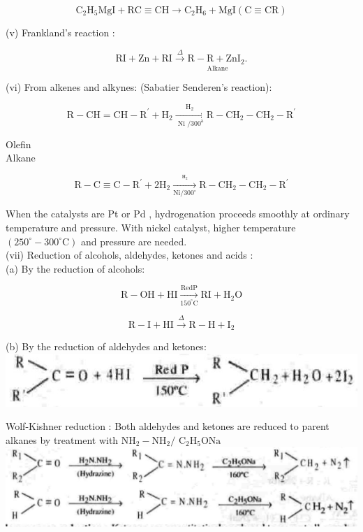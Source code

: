 \documentclass[10pt]{article}
\begin{document}
$$
\mathrm{C}_{2} \mathrm{H}_{5} \mathrm{MgI}+\mathrm{RC} \equiv \mathrm{CH} \longrightarrow \mathrm{C}_{2} \mathrm{H}_{6}+\mathrm{MgI}(\mathrm{C} \equiv \mathrm{CR})
$$

(v) Frankland's reaction :

$$
\mathrm{RI}+\mathrm{Zn}+\mathrm{RI} \xrightarrow{\Delta} \underset{\text { Alkane }}{\mathrm{R}-\mathrm{R}+\mathrm{ZnI}_{2} .}
$$

(vi) From alkenes and alkynes: (Sabatier Senderen's reaction):

$$
\mathrm{R}-\mathrm{CH}=\mathrm{CH}-\mathrm{R}^{\prime}+\mathrm{H}_{2} \xrightarrow[\text { Ni } / 300^{\mathrm{a}}]{\mathrm{H}_{2}} \mathrm{R}-\mathrm{CH}_{2}-\mathrm{CH}_{2}-\mathrm{R}^{\prime}
$$

Olefin\\
Alkane

$$
\mathrm{R}-\mathrm{C} \equiv \mathrm{C}-\mathrm{R}^{\prime}+2 \mathrm{H}_{2} \xrightarrow[\mathrm{Ni} / 300^{\circ}]{\stackrel{\mathrm{H}_{2}}{ }} \mathrm{R}-\mathrm{CH}_{2}-\mathrm{CH}_{2}-\mathrm{R}^{\prime}
$$

When the catalysts are Pt or Pd , hydrogenation proceeds smoothly at ordinary temperature and pressure. With nickel catalyst, higher temperature $\left(250^{\circ}-300^{\circ} \mathrm{C}\right)$ and pressure are needed.\\
(vii) Reduction of alcohols, aldehydes, ketones and acids :\\
(a) By the reduction of alcohols:

$$
\mathrm{R}-\mathrm{OH}+\mathrm{HI} \xrightarrow[150^{\circ} \mathrm{C}]{\mathrm{Red} \mathrm{P}} \mathrm{RI}+\mathrm{H}_{2} \mathrm{O}
$$

$$
\mathrm{R}-\mathrm{I}+\mathrm{HI} \xrightarrow{\Delta} \mathrm{R}-\mathrm{H}+\mathrm{I}_{2}
$$

(b) By the reduction of aldehydes and ketones:\\
\includegraphics[max width=\textwidth, center]{2025_01_28_8470952b98110cec3aabg-172(1)}

Wolf-Kishner reduction : Both aldehydes and ketones are reduced to parent alkanes by treatment with $\mathrm{NH}_{2}-\mathrm{NH}_{2} /$ $\mathrm{C}_{2} \mathrm{H}_{5} \mathrm{ONa}$\\
\includegraphics[max width=\textwidth, center]{2025_01_28_8470952b98110cec3aabg-172(3)}
\end{document}
